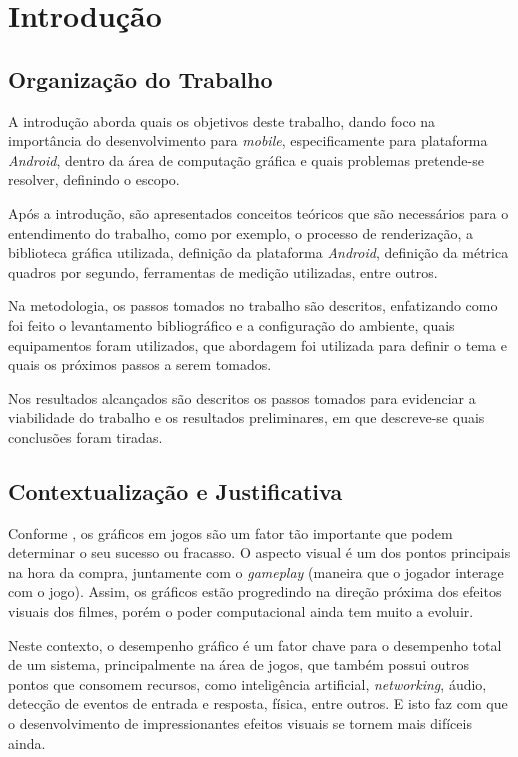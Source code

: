 \chapter[Introdução]{Introdução}

\section{Organização do Trabalho}

	A introdução aborda quais os objetivos deste trabalho, dando foco na importância do desenvolvimento para \textit{mobile}, especificamente para plataforma \textit{Android}, dentro da área de computação gráfica e quais problemas pretende-se resolver, definindo o escopo.

	Após a introdução, são apresentados conceitos teóricos que são necessários para o entendimento do trabalho, como por exemplo, o processo de renderização, a biblioteca gráfica utilizada,  definição da plataforma \textit{Android}, definição da métrica quadros por segundo, ferramentas de medição utilizadas, entre outros. 

	Na metodologia, os passos tomados no trabalho são descritos, enfatizando como foi feito o levantamento bibliográfico e a configuração do ambiente, quais equipamentos foram utilizados, que abordagem foi utilizada para definir o tema e quais os próximos passos a serem tomados. 

	Nos resultados alcançados são descritos os passos tomados para evidenciar a viabilidade do trabalho e os resultados preliminares, em que descreve-se quais conclusões foram tiradas.     

\section{Contextualização e Justificativa}

	
	Conforme \cite{graphicsprog}, os gráficos em jogos são um fator tão importante que podem determinar o seu sucesso ou fracasso. O aspecto visual é um dos pontos principais na hora da compra, juntamente com o \textit{gameplay} (maneira que o jogador interage com o jogo). Assim, os gráficos estão progredindo na direção próxima dos efeitos visuais dos filmes, porém o poder computacional ainda tem muito a evoluir.

	 Neste contexto, o desempenho gráfico é um fator chave para o desempenho total de um sistema, principalmente na área de jogos, que também possui outros pontos que consomem recursos, como inteligência artificial, \textit{networking}, áudio, detecção de eventos de entrada e resposta, física, entre outros. E isto faz com que o desenvolvimento de impressionantes efeitos visuais se tornem mais difíceis ainda.

